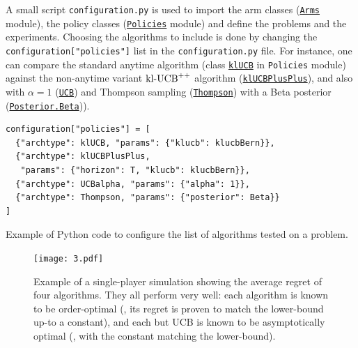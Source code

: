 A small script \texttt{configuration.py}
is used to import the arm classes (\texttt{\href{https://SMPyBandits.GitHub.io/docs/Arms.html}{Arms}} module), the policy classes (\texttt{\href{https://SMPyBandits.GitHub.io/docs/Policies.html}{Policies}} module) and define the problems and the experiments.
Choosing the algorithms to include is done by changing
the \texttt{configuration["policies"]} list in the \texttt{configuration.py} file.
For instance, one can compare the standard anytime \klUCB{} algorithm (class \texttt{\href{https://SMPyBandits.GitHub.io/docs/Policies.klUCB.html}{klUCB}} in \texttt{Policies} module) against the non-anytime variant $\mathrm{kl}\text{-}\mathrm{UCB}^{++}$ algorithm (\texttt{\href{https://SMPyBandits.GitHub.io/docs/Policies.klUCBPlusPlus.html}{klUCBPlusPlus}}), and also \UCB{} with $\alpha=1$ (\texttt{\href{https://SMPyBandits.GitHub.io/docs/Policies.UCBalpha.html}{UCB}}) and Thompson sampling (\texttt{\href{https://SMPyBandits.GitHub.io/docs/Policies.Thompson.html}{Thompson}}) with a Beta posterior (\texttt{\href{https://SMPyBandits.GitHub.io/docs/Policies.Posterior.Beta.html}{Posterior.Beta}})).

\begin{small}
\begin{listing}[h!]
    \begin{verbatim}
configuration["policies"] = [
  {"archtype": klUCB, "params": {"klucb": klucbBern}},
  {"archtype": klUCBPlusPlus,
   "params": {"horizon": T, "klucb": klucbBern}},
  {"archtype": UCBalpha, "params": {"alpha": 1}},
  {"archtype": Thompson, "params": {"posterior": Beta}}
]
    \end{verbatim}
    \caption{Example of Python code to configure the list of algorithms tested on a problem.}
    \label{lst:3:howToConfigureAlgorithms}
\end{listing}
\end{small}

\begin{figure}[h!]  %
	\centering
	\texttt{[image: 3.pdf]}
	\caption[Example of a single-player simulation showing the average regret of $4$ algorithms]{
		Example of a single-player simulation showing the average regret of four algorithms. They all perform very well: each algorithm is known to be order-optimal (\ie, its regret is proven to match the lower-bound up-to a constant), and each but UCB is known to be asymptotically optimal (\ie, with the constant matching the lower-bound).
	}
	\label{fig:3:firstPlot}
\end{figure}

